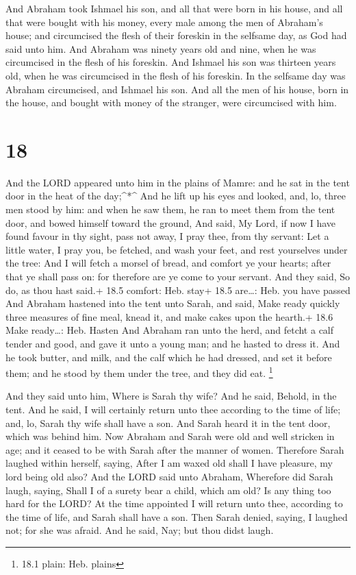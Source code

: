  And Abraham took Ishmael his son, and all that were born
in his house, and all that were bought with his money, every male among
the men of Abraham's house; and circumcised the flesh of their foreskin
in the selfsame day, as God had said unto him.  And Abraham
was ninety years old and nine, when he was circumcised in the flesh of
his foreskin.  And Ishmael his son was thirteen years old,
when he was circumcised in the flesh of his foreskin.  In
the selfsame day was Abraham circumcised, and Ishmael his son.
 And all the men of his house, born in the house, and
bought with money of the stranger, were circumcised with him.

\hypertarget{section-17}{%
\section{18}\label{section-17}}

 And the LORD appeared unto him in the plains of Mamre: and
he sat in the tent door in the heat of the day;\^{}*\^{} 
And he lift up his eyes and looked, and, lo, three men stood by him: and
when he saw them, he ran to meet them from the tent door, and bowed
himself toward the ground,  And said, My Lord, if now I have
found favour in thy sight, pass not away, I pray thee, from thy servant:
 Let a little water, I pray you, be fetched, and wash your
feet, and rest yourselves under the tree:  And I will fetch
a morsel of bread, and comfort ye your hearts; after that ye shall pass
on: for therefore are ye come to your servant. And they said, So do, as
thou hast said.+ 18.5 comfort: Heb. stay+ 18.5 are\ldots: Heb. you have
passed  And Abraham hastened into the tent unto Sarah, and
said, Make ready quickly three measures of fine meal, knead it, and make
cakes upon the hearth.+ 18.6 Make ready\ldots: Heb. Hasten 
And Abraham ran unto the herd, and fetcht a calf tender and good, and
gave it unto a young man; and he hasted to dress it.  And he
took butter, and milk, and the calf which he had dressed, and set it
before them; and he stood by them under the tree, and they did eat.
\footnote{18.1 plain: Heb. plains}

 And they said unto him, Where is Sarah thy wife? And he
said, Behold, in the tent.  And he said, I will certainly
return unto thee according to the time of life; and, lo, Sarah thy wife
shall have a son. And Sarah heard it in the tent door, which was behind
him.  Now Abraham and Sarah were old and well stricken in
age; and it ceased to be with Sarah after the manner of women.
 Therefore Sarah laughed within herself, saying, After I am
waxed old shall I have pleasure, my lord being old also? 
And the LORD said unto Abraham, Wherefore did Sarah laugh, saying, Shall
I of a surety bear a child, which am old?  Is any thing too
hard for the LORD? At the time appointed I will return unto thee,
according to the time of life, and Sarah shall have a son. 
Then Sarah denied, saying, I laughed not; for she was afraid. And he
said, Nay; but thou didst laugh.

